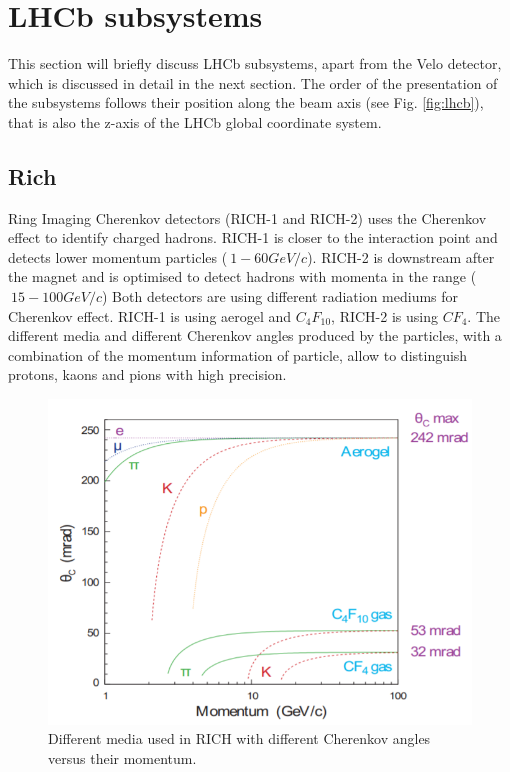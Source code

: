 \section{LHCb subsystems}

This section will briefly discuss LHCb subsystems, apart from the Velo detector, which is discussed in detail in the next section.
The order of the presentation of the subsystems follows their position along the beam axis (see Fig. \ref{fig:lhcb}), that is also the z-axis of the LHCb global coordinate system.

\subsection{Rich}
Ring Imaging Cherenkov detectors (RICH-1 and RICH-2) uses the Cherenkov effect to identify charged hadrons.
RICH-1 is closer to the interaction point and detects lower momentum particles ($~1-60GeV/c$). RICH-2 is downstream after the magnet and is optimised to detect hadrons with momenta in the range ($~15-100GeV/c$)
Both detectors are using different radiation mediums for Cherenkov effect. RICH-1 is using aerogel and $C_{4}F_{10}$, RICH-2 is using $CF_{4}$.
The different media and different Cherenkov angles produced by the particles, with a combination of the momentum information of particle, allow to distinguish protons, kaons and pions with high precision.


\begin{figure}
  \centering
  \includegraphics[width=0.7\linewidth]{figures/chapter2/cherenkov_mediums.png}
  \caption{Different media used in RICH with different Cherenkov angles versus their momentum.}
  \label{fig:cherenkov_media}
\end{figure}

